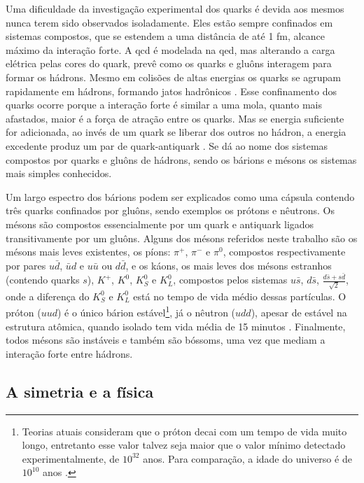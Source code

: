 Uma dificuldade da investigação experimental dos quarks é devida aos mesmos
nunca terem sido observados isoladamente. Eles estão sempre confinados em sistemas
compostos, que se estendem a uma distância de até 1 fm, alcance máximo da interação forte. 
A \gls{qcd} é modelada na \gls{qed}, mas alterando a carga elétrica pelas cores do quark, 
prevê como os quarks e gluôns interagem para formar os hádrons. Mesmo
em colisões de altas energias os quarks se agrupam rapidamente em hádrons,
formando jatos hadrônicos \cite{Intro_Nuclear}. Esse confinamento dos quarks ocorre 
porque a interação forte é similar a uma mola, quanto mais afastados, maior é a
força de atração entre os quarks. Mas se energia suficiente for adicionada,
ao invés de um quark se liberar dos outros no hádron, a energia excedente produz
um par de quark-antiquark \cite{Beiser}.
Se dá ao nome dos sistemas compostos por quarks e gluôns de
hádrons, sendo os bárions e mésons os sistemas mais simples conhecidos. 

 
Um largo espectro dos bárions podem ser explicados como uma cápsula contendo
três quarks confinados por gluôns, sendo exemplos os prótons e nêutrons. Os mésons
são compostos essencialmente por um quark e antiquark ligados
transitivamente por um gluôns. Alguns dos mésons referidos neste trabalho são
os mésons mais leves existentes, os píons: $\pi^{+}$,
$\pi^{-}$ e $\pi^{0}$, compostos respectivamente por pares $u\bar{d}$, $\bar{u}d$ e
$u\bar{u}$ ou $d\bar{d}$, e os káons, os mais leves dos mésons estranhos
(contendo quarks $s$), $K^{+}$, $K^{0}$, $K^{0}_{S}$ e $K^{0}_{L}$, 
compostos pelos sistemas $u\bar{s}$, $d\bar{s}$,
$\frac{d\bar{s}+s\bar{d}}{\sqrt{2}}$, onde a diferença do $K^{0}_{S}$ e
$K^{0}_{L}$ está no tempo de vida médio dessas partículas. 
O próton ($uud$) é o único bárion estável\footnote{Teorias atuais consideram que
o próton decai com um tempo de vida muito longo, entretanto esse valor talvez seja maior 
que o valor mínimo detectado experimentalmente, de $10^{32}$ anos. 
Para comparação, a idade do universo é de $10^{10}$ anos \cite{Beiser}.}, 
já o nêutron ($udd$), apesar de estável na estrutura atômica,
quando isolado tem vida média de 15 minutos \cite{Intro_Standard}. Finalmente, 
todos mésons são instáveis e também são bóssoms, uma vez que mediam a interação
forte entre hádrons.

\subsection{A simetria e a física}
\label{ssec:simetria}

